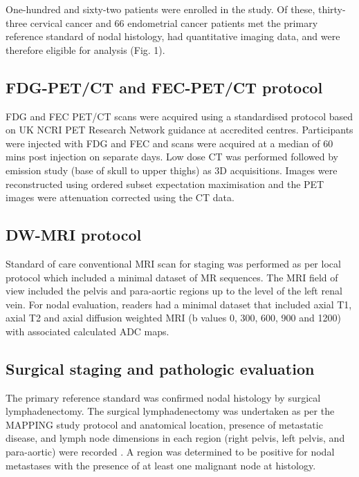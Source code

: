 \documentclass[sn-standardnature]{sn-jnl}
\theoremstyle{thmstyleone}%
\theoremstyle{thmstyletwo}%
\theoremstyle{thmstylethree}%
\begin{document}
    One-hundred and sixty-two patients were enrolled in the study. Of these, thirty-three cervical cancer and 66 endometrial cancer patients met the primary reference standard of nodal histology, had quantitative imaging data, and were therefore eligible for analysis (Fig. 1).


    \subsection{FDG-PET/CT and FEC-PET/CT protocol}
    FDG and FEC PET/CT scans were acquired using a standardised protocol based on UK NCRI PET Research Network guidance at accredited centres.
    Participants were injected with FDG and FEC and scans were acquired at a median of 60 mins post injection on separate days.
    Low dose CT was performed followed by emission study (base of skull to upper thighs) as 3D acquisitions. 
    Images were reconstructed using ordered subset expectation maximisation and the PET images were attenuation corrected using the CT data. 

    \subsection{DW-MRI protocol}
    Standard of care conventional MRI scan for staging was performed as per local protocol which included a minimal dataset of MR sequences. 
    The MRI field of view included the pelvis and para-aortic regions up to the level of the left renal vein. 
    For nodal evaluation, readers had a minimal dataset that included axial T1, axial T2 and axial diffusion weighted MRI (b values 0, 300, 600, 900 and 1200) with associated calculated ADC maps.

    \subsection{Surgical staging and pathologic evaluation}
    The primary reference standard was confirmed nodal histology by surgical lymphadenectomy. 
    The surgical lymphadenectomy was undertaken as per the MAPPING study protocol and anatomical location, presence of metastatic disease, and lymph node dimensions in each region (right pelvis, left pelvis, and para-aortic) were recorded \cite{rockallDiagnosticAccuracyFECPET2021}. 
    A region was determined to be positive for nodal metastases with the presence of at least one malignant node at histology.
\end{document}
